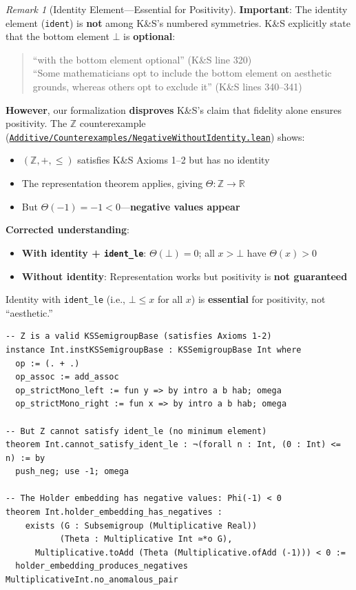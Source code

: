 \documentclass[11pt]{article}
\theoremstyle{definition}
\theoremstyle{remark}
\newtheorem{remark}[theorem]{Remark}
\begin{document}
\begin{remark}[Identity Element---Essential for Positivity]
\textbf{Important}: The identity element (\texttt{ident}) is \textbf{not} among K\&S's numbered symmetries.
K\&S explicitly state that the bottom element $\bot$ is \textbf{optional}:
\begin{quote}
``with the bottom element optional'' (K\&S line 320)\\
``Some mathematicians opt to include the bottom element on aesthetic grounds, whereas others opt to exclude it'' (K\&S lines 340--341)
\end{quote}

\textbf{However}, our formalization \textbf{disproves} K\&S's claim that fidelity alone ensures positivity.
The $\mathbb{Z}$ counterexample (\href{https://github.com/zariuq/ks-foundations-of-inference/blob/main/KnuthSkilling/Additive/Counterexamples/NegativeWithoutIdentity.lean}{\texttt{Additive/Counterexamples/NegativeWithoutIdentity.lean}}) shows:
\begin{itemize}
\item $(\mathbb{Z}, +, \leq)$ satisfies K\&S Axioms 1--2 but has no identity
\item The representation theorem applies, giving $\Theta : \mathbb{Z} \to \mathbb{R}$
\item But $\Theta(-1) = -1 < 0$---\textbf{negative values appear}
\end{itemize}

\textbf{Corrected understanding}:
\begin{itemize}
\item \textbf{With identity + \texttt{ident\_le}}: $\Theta(\bot) = 0$; all $x > \bot$ have $\Theta(x) > 0$
\item \textbf{Without identity}: Representation works but positivity is \textbf{not guaranteed}
\end{itemize}

Identity with \texttt{ident\_le} (i.e., $\bot \leq x$ for all $x$) is \textbf{essential} for positivity, not ``aesthetic.''

\begin{lstlisting}[caption={$\mathbb{Z}$ counterexample: representation works but positivity fails}]
-- Z is a valid KSSemigroupBase (satisfies Axioms 1-2)
instance Int.instKSSemigroupBase : KSSemigroupBase Int where
  op := (. + .)
  op_assoc := add_assoc
  op_strictMono_left := fun y => by intro a b hab; omega
  op_strictMono_right := fun x => by intro a b hab; omega

-- But Z cannot satisfy ident_le (no minimum element)
theorem Int.cannot_satisfy_ident_le : ¬(forall n : Int, (0 : Int) <= n) := by
  push_neg; use -1; omega

-- The Holder embedding has negative values: Phi(-1) < 0
theorem Int.holder_embedding_has_negatives :
    exists (G : Subsemigroup (Multiplicative Real))
           (Theta : Multiplicative Int ≃*o G),
      Multiplicative.toAdd (Theta (Multiplicative.ofAdd (-1))) < 0 :=
  holder_embedding_produces_negatives MultiplicativeInt.no_anomalous_pair
\end{lstlisting}
\end{remark}
\end{document}
